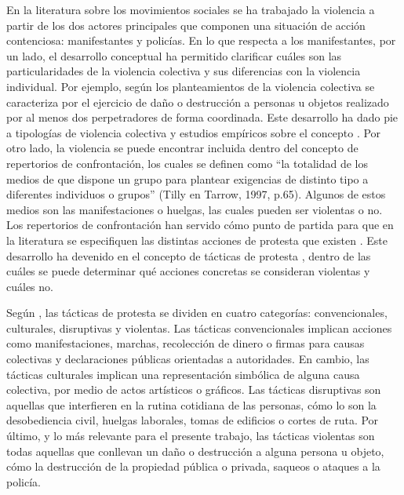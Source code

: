 \documentclass[12pt,twoside]{templates/facsothesis}
\begin{document}
En la literatura sobre los movimientos sociales se ha trabajado la violencia a partir de los dos actores principales que componen una situación de acción contenciosa: manifestantes y policías. En lo que respecta a los manifestantes, por un lado, el desarrollo conceptual ha permitido clarificar cuáles son las particularidades de la violencia colectiva y sus diferencias con la violencia individual. Por ejemplo, según los planteamientos de \citet{Tilly2003} la violencia colectiva se caracteriza por el ejercicio de daño o destrucción a personas u objetos realizado por al menos dos perpetradores de forma coordinada. Este desarrollo ha dado pie a tipologías de violencia colectiva \citep{Tilly2003} y estudios empíricos sobre el concepto \citep[e.g.][]{Adang2011}. Por otro lado, la violencia se puede encontrar incluida dentro del concepto de repertorios de confrontación, los cuales se definen como ``la totalidad de los medios de que dispone un grupo para plantear exigencias de distinto tipo a diferentes individuos o grupos'' (Tilly en Tarrow, 1997, p.65). Algunos de estos medios son las manifestaciones o huelgas, las cuales pueden ser violentas o no. Los repertorios de confrontación han servido cómo punto de partida para que en la literatura se especifiquen las distintas acciones de protesta que existen \citep{Taylor2004, VanDyke2004}. Este desarrollo ha devenido en el concepto de tácticas de protesta \citep{Medel2016}, dentro de las cuáles se puede determinar qué acciones concretas se consideran violentas y cuáles no.

Según \citet{Medel2016}, las tácticas de protesta se dividen en cuatro categorías: convencionales, culturales, disruptivas y violentas. Las tácticas convencionales implican acciones como manifestaciones, marchas, recolección de dinero o firmas para causas colectivas y declaraciones públicas orientadas a autoridades. En cambio, las tácticas culturales implican una representación simbólica de alguna causa colectiva, por medio de actos artísticos o gráficos. Las tácticas disruptivas son aquellas que interfieren en la rutina cotidiana de las personas, cómo lo son la desobediencia civil, huelgas laborales, tomas de edificios o cortes de ruta. Por último, y lo más relevante para el presente trabajo, las tácticas violentas son todas aquellas que conllevan un daño o destrucción a alguna persona u objeto, cómo la destrucción de la propiedad pública o privada, saqueos o ataques a la policía.
\end{document}
